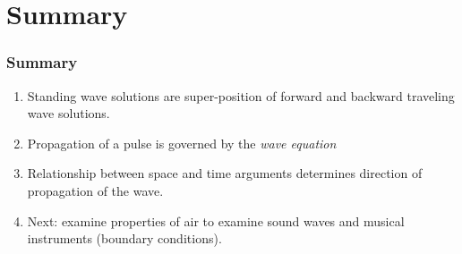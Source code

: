 \documentclass[pdf, handout, hideothersubsections]{beamer}
\begin{document}
\section{Summary}
\begin{frame}
\frametitle{Summary}
\begin{enumerate}
\pause
\item Standing wave solutions are super-position of forward and
  backward traveling wave solutions.

\item Propagation of a pulse is governed by the \emph{wave equation}

\item Relationship between space and time arguments determines
  direction of propagation of the wave.

\item Next: examine properties of air to examine sound waves and
  musical instruments (boundary conditions).

\end{enumerate}

\end{frame}
\end{document}
